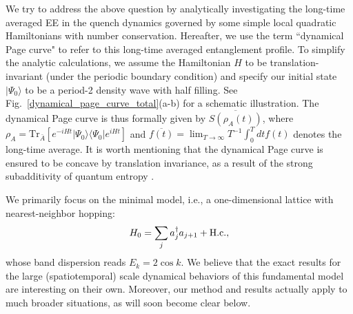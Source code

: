 \documentclass[twocolumn,english,prl,aps,superscriptaddress,amsmath,amssymb,floatfix]{revtex4-2}
\def \Tr {\mathrm{Tr}}
\begin{document}
We try to address the above question by %
analytically investigating the long-time averaged EE in the quench dynamics governed by %
some simple local quadratic Hamiltonians with number conservation. Hereafter, we use the term ``dynamical Page curve" to refer to this long-time averaged entanglement profile. 
To simplify the analytic calculations, we assume the Hamiltonian $H$ to be translation-invariant (under the periodic boundary condition) and specify our initial state $|\Psi_0\rangle$ to be %
a period-2 density wave with half filling. See Fig.~\ref{dynamical_page_curve_total}(a-b) for a schematic illustration. The dynamical Page curve is thus formally given by $\overline{S(\rho_A(t))}$, where $\rho_A=\Tr_{\bar A}[e^{-iHt}|\Psi_0\rangle\langle\Psi_0|e^{iHt}]$ and $\overline{f(t)}=\lim_{T\to\infty}T^{-1}\int^T_0 dt f(t)$ denotes the long-time average. It is worth mentioning that the dynamical Page curve is ensured to be concave by translation invariance, as a result of the strong subadditivity of quantum entropy \cite{Wolf2008}.

We primarily focus on the minimal %
model, i.e., a one-dimensional lattice with nearest-neighbor hopping:
\begin{equation}
H_{0}=\sum_{j}a_{j}^{\dagger}a_{j+1}+{\rm H.c.},
\label{eq:NNH_Hamiltonian}
\end{equation}
whose %
band dispersion reads $E_k=2\cos k$. We believe that the exact results for the large (spatiotemporal) scale dynamical behaviors of this fundamental model are interesting on their own.  Moreover, our method and results actually apply to much broader situations, as will soon become clear below. %
\end{document}
